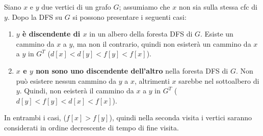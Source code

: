\documentclass[11pt]{article}
\begin{document}
Siano $x$ e $y$ due vertici di un grafo $G$; assumiamo che $x$ non sia sulla stessa cfc di $y$. Dopo la DFS su $G$ si possono 
presentare i seguenti casi:
\begin{enumerate}
    \item \textbf{$y$ è discendente di $x$} in un albero della foresta DFS di $G$. Esiste un cammino da $x$ a $y$, ma non
    il contrario, quindi non esisterà un cammino da $x$ a $y$ in $G^T$ ($d[x]<d[y]<f[y]<f[x]$).
    \item \textbf{$x$ e $y$ non sono uno discendente dell'altro} nella foresta DFS di $G$. Non può esistere nessun cammino 
    da $y$ a $x$, altrimenti $x$ sarebbe nel sottoalbero di $y$. Quindi, non eeisterà il cammino da $x$ a $y$ in $G^T$ 
    ($d[y]<f[y]<d[x]<f[x]$).
\end{enumerate}
In entrambi i casi, ($f[x]>f[y]$), quindi nella seconda visita i vertici saranno considerati in ordine decrescente di tempo 
di fine visita.
\end{document}
